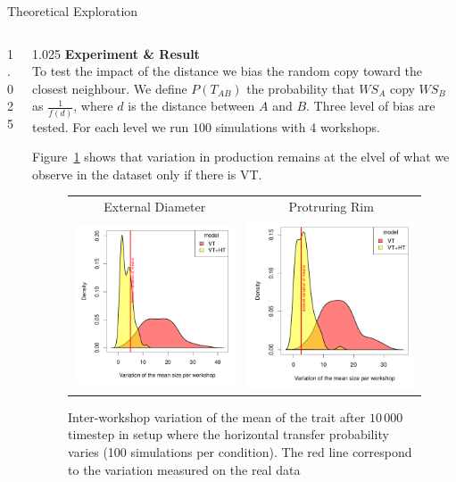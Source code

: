 \documentclass[final]{beamer}
\newlength{\onecolwid}
\newlength{\twocolwid}
\begin{document}
\begin{frame}[t]
\begin{columns}[t]
\begin{column}{\twocolwid}
\begin{block}{Theoretical Exploration}
\begin{columns}[t,totalwidth=\twocolwid]
\begin{column}{1.025\onecolwid}
\begin{center}
{    }
\end{center}
\end{column}

\begin{column}{1.025\onecolwid} %
{\textbf{Experiment \& Result}}\\
\justify
To test the impact of the distance we bias the random copy toward the closest neighbour. We define $P(T_{AB})$ the probability that $WS_A$ copy $WS_B$ as $\frac{1}{f(d)}$, where $d$ is the distance between $A$ and $B$. Three level of bias are tested. For each level we run $100$ simulations with 4 workshops. %

Figure~\ref{fig:resmod} shows that variation in production remains at the elvel of what we observe in the dataset only if there is VT.
    \begin{figure}[h!]
	\begin{tabular}{cc}
	    \centering
	    External Diameter & Protruring Rim\\
	    \includegraphics[width=0.4\linewidth]{images/ED_densities.pdf}&
	    \includegraphics[width=0.4\linewidth]{images/PR_densities.pdf}\\
	\end{tabular}
\singlespace
\vspace{-.8cm}
\caption{Inter-workshop variation of the mean of the trait after $10\,000$ timestep in setup where the horizontal transfer probability varies (100 simulations per condition). The red line correspond to the variation measured on the real data}
	\label{fig:resmod}
    \end{figure}
\vspace{-1cm}
\end{column}
\end{columns}


\end{block}
\end{column}
\end{columns}
\end{frame}
\end{document}
